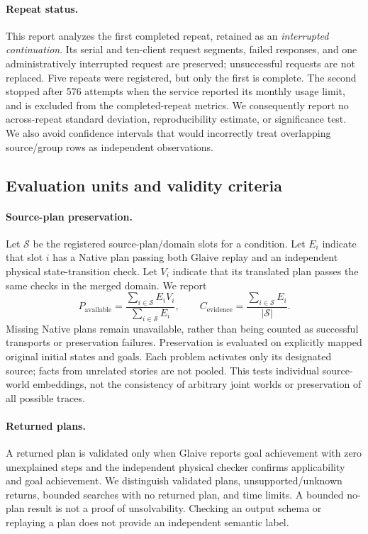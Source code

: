 \paragraph{Repeat status.}
This report analyzes the first completed repeat, retained as an \emph{interrupted continuation}. Its serial and ten-client request segments, failed responses, and one administratively interrupted request are preserved; unsuccessful requests are not replaced. Five repeats were registered, but only the first is complete. The second stopped after 576 attempts when the service reported its monthly usage limit, and is excluded from the completed-repeat metrics. We consequently report no across-repeat standard deviation, reproducibility estimate, or significance test. We also avoid confidence intervals that would incorrectly treat overlapping source/group rows as independent observations.

\subsection{Evaluation units and validity criteria}

\paragraph{Source-plan preservation.}
Let $\mathcal{S}$ be the registered source-plan/domain slots for a condition. Let $E_i$ indicate that slot $i$ has a Native plan passing both Glaive replay and an independent physical state-transition check. Let $V_i$ indicate that its translated plan passes the same checks in the merged domain. We report
\[
 P_{\mathrm{available}}=\frac{\sum_{i\in\mathcal{S}}E_iV_i}{\sum_{i\in\mathcal{S}}E_i},
 \qquad
 C_{\mathrm{evidence}}=\frac{\sum_{i\in\mathcal{S}}E_i}{|\mathcal{S}|}.
\]
Missing Native plans remain unavailable, rather than being counted as successful transports or preservation failures. Preservation is evaluated on explicitly mapped original initial states and goals. Each problem activates only its designated source; facts from unrelated stories are not pooled. This tests individual source-world embeddings, not the consistency of arbitrary joint worlds or preservation of all possible traces.

\paragraph{Returned plans.}
A returned plan is validated only when Glaive reports goal achievement with zero unexplained steps and the independent physical checker confirms applicability and goal achievement. We distinguish validated plans, unsupported/unknown returns, bounded searches with no returned plan, and time limits. A bounded no-plan result is not a proof of unsolvability. Checking an output schema or replaying a plan does not provide an independent semantic label.


